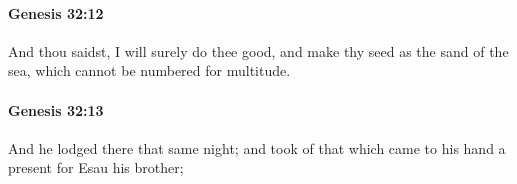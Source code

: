 		\paragraph{Genesis 32:12} %
			\label{GENESIS-32-12}

			And thou saidst, I will surely do thee good, and make thy seed as the sand of the sea, which cannot be numbered for multitude.


		\paragraph{Genesis 32:13} %
			\label{GENESIS-32-13}

			And he lodged there that same night; and took of that which came to his hand a present for Esau his brother;


